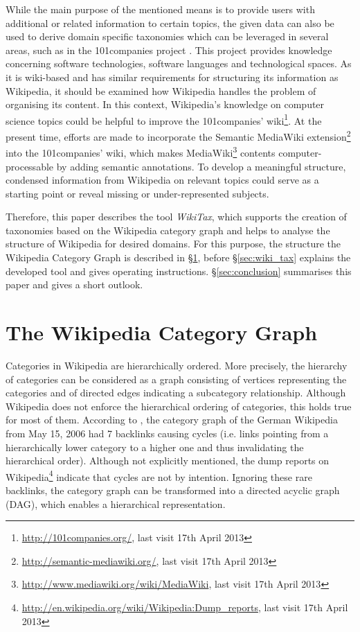 \documentclass{scrartcl}
\begin{document}
While the main purpose of the mentioned means is to provide users with additional or related information to certain topics, the given data can also be used to derive domain specific taxonomies which can be leveraged in several areas, such as in the 101companies project \cite{FavreLaemmel101}. This project provides knowledge concerning software technologies, software languages and technological spaces. As it is wiki-based and has similar requirements for structuring its information as Wikipedia, it should be examined how Wikipedia handles the problem of organising its content. In this context, Wikipedia's knowledge on computer science topics could be helpful to improve the 101companies' wiki\footnote{\url{http://101companies.org/}, last visit 17th April 2013}. At the present time, efforts are made to incorporate the Semantic MediaWiki extension\footnote{\url{http://semantic-mediawiki.org/}, last visit 17th April 2013} into the 101companies' wiki, which makes MediaWiki\footnote{\url{http://www.mediawiki.org/wiki/MediaWiki}, last visit 17th April 2013} contents computer-processable by adding semantic annotations. To develop a meaningful structure, condensed information from Wikipedia on relevant topics could serve as a starting point or reveal missing or under-represented subjects.

Therefore, this paper describes the tool \emph{WikiTax}, which supports the creation of taxonomies based on the Wikipedia category graph and helps to analyse the structure of Wikipedia for desired domains. For this purpose, the structure the Wikipedia Category Graph is described in §\ref{sec:category_graph}, before §\ref{sec:wiki_tax} explains the developed tool and gives operating instructions. §\ref{sec:conclusion} summarises this paper and gives a short outlook.

\section{The Wikipedia Category Graph}
\label{sec:category_graph}
Categories in Wikipedia are hierarchically ordered. More precisely, the hierarchy of categories can be considered as a graph consisting of vertices representing the categories and of directed edges indicating a subcategory relationship. Although Wikipedia does not enforce the hierarchical ordering of categories, this holds true for most of them. According to \cite{ZeschGurevych2007analysis}, the category graph of the German Wikipedia from May 15, 2006 had 7 backlinks causing cycles (i.e. links pointing from a hierarchically lower category to a higher one and thus invalidating the hierarchical order). Although not explicitly mentioned, the dump reports on Wikipedia\footnote{\url{http://en.wikipedia.org/wiki/Wikipedia:Dump_reports}, last visit 17th April 2013} indicate that cycles are not by intention. Ignoring these rare backlinks, the category graph can be transformed into a directed acyclic graph (DAG), which enables a hierarchical representation.
\end{document}
